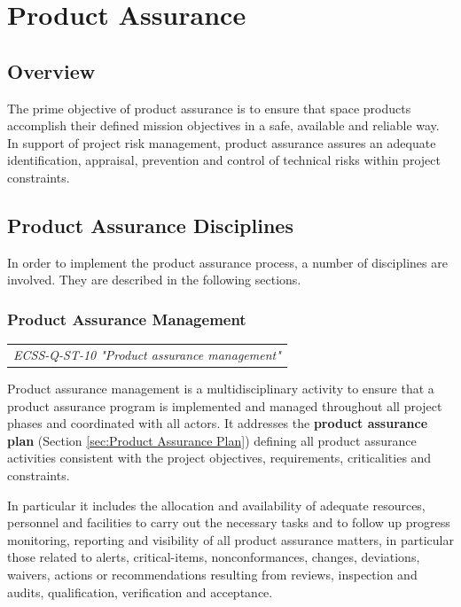 \chapter{Product Assurance}

\section{Overview}

The prime objective of product assurance is to ensure that space products accomplish their defined mission objectives in a safe, available and reliable way. In support of project risk management, product assurance assures an adequate identification, appraisal, prevention and control of technical risks within project constraints.

\section{Product Assurance Disciplines}

In order to implement the product assurance process, a number of disciplines are involved. They are described in the following sections.

\subsection{Product Assurance Management}

\begin{tabular}{l}
\textit{ECSS-Q-ST-10 "Product assurance management" \cite{ECSS-Q-ST-10}}
\end{tabular}

Product assurance management is a multidisciplinary activity to ensure that a product assurance program is implemented and managed throughout all project phases and coordinated with all actors. It addresses the \textbf{product assurance plan} (Section \ref{sec:Product Assurance Plan}) defining all product assurance activities consistent with the project objectives, requirements, criticalities and constraints. 

In particular it includes the allocation and availability of adequate resources, personnel and facilities to carry out the necessary tasks and to follow up progress monitoring, reporting and visibility of all product assurance matters, in particular those related to alerts, critical-items, nonconformances, changes, deviations, waivers, actions or recommendations resulting from reviews, inspection and audits, qualification, verification and acceptance.

